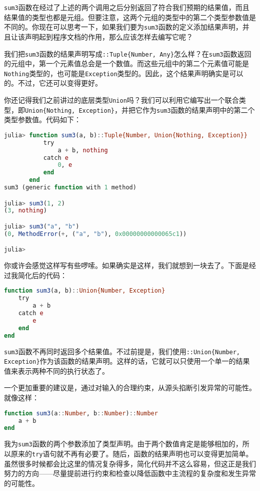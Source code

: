 \verb|sum3|函数在经过了上述的两个调用之后分别返回了符合我们预期的结果值，而且结果值的类型也都是元组。但要注意，这两个元组的类型中的第二个类型参数值是不同的。你现在可以思考一下，如果我们要为\verb|sum3|函数的定义添加结果声明，并且让该声明起到程序文档的作用，那么应该怎样去编写它呢？

我们把\verb|sum3|函数的结果声明写成\verb|::Tuple{Number, Any}|怎么样？在\verb|sum3|函数返回的元组中，第一个元素值总会是一个数值。而这些元组中的第二个元素值可能是\verb|Nothing|类型的，也可能是\verb|Exception|类型的。因此，这个结果声明确实是可以的。不过，它还可以变得更好。

你还记得我们之前讲过的底层类型\verb|Union|吗？我们可以利用它编写出一个联合类型，即\verb|Union{Nothing, Exception}|，并把它作为\verb|sum3|函数的结果声明中的第二个类型参数值。代码如下：

\begin{lstlisting}[language=julia]
julia> function sum3(a, b)::Tuple{Number, Union{Nothing, Exception}}
           try
               a + b, nothing
           catch e
               0, e
           end
       end
sum3 (generic function with 1 method)

julia> sum3(1, 2)
(3, nothing)

julia> sum3("a", "b")
(0, MethodError(+, ("a", "b"), 0x00000000000065c1))

julia> 
\end{lstlisting}

你或许会感觉这样写有些啰嗦。如果确实是这样，我们就想到一块去了。下面是经过我简化后的代码：

\begin{lstlisting}[language=julia]
function sum3(a, b)::Union{Number, Exception}
    try
        a + b
    catch e
        e
    end
end
\end{lstlisting}

\verb|sum3|函数不再同时返回多个结果值。不过前提是，我们使用\verb|::Union{Number, Exception}|作为该函数的结果声明。这样的话，它就可以只使用一个单一的结果值来表示两种不同的执行状态了。

一个更加重要的建议是，通过对输入的合理约束，从源头掐断引发异常的可能性。就像这样：

\begin{lstlisting}[language=julia]
function sum3(a::Number, b::Number)::Number
    a + b
end
\end{lstlisting}

我为\verb|sum3|函数的两个参数添加了类型声明。由于两个数值肯定是能够相加的，所以原来的\verb|try|语句就不再有必要了。随后，函数的结果声明也可以变得更加简单。虽然很多时候都会比这里的情况复杂得多，简化代码并不这么容易，但这正是我们努力的方向——尽量提前进行约束和检查以降低函数中主流程的复杂度和发生异常的可能性。

